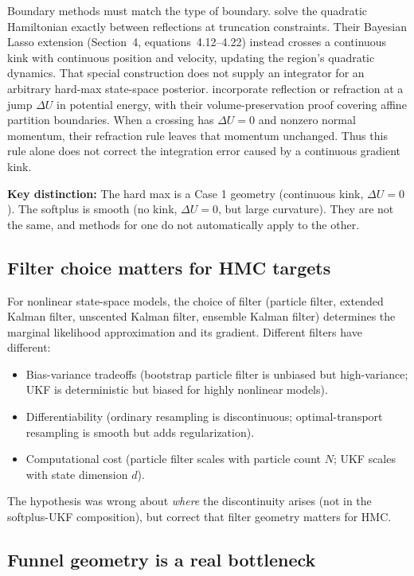 Boundary methods must match the type of boundary.
\citet[Section~2]{Pakman2014} solve the quadratic Hamiltonian exactly between
reflections at truncation constraints. Their Bayesian Lasso extension
(Section~4, equations~4.12--4.22) instead crosses a continuous kink with
continuous position and velocity, updating the region's quadratic dynamics.
That special construction does not supply an integrator for an arbitrary
hard-max state-space posterior. \citet[Algorithm~1 and Section~5]{Afshar2015}
incorporate reflection or refraction at a jump $\Delta U$ in potential energy,
with their volume-preservation proof covering affine partition boundaries.
When a crossing has $\Delta U=0$ and nonzero normal momentum, their refraction
rule leaves that momentum unchanged. Thus this rule alone does not correct
the integration error caused by a continuous gradient kink.

\textbf{Key distinction:} The hard max is a Case 1 geometry (continuous kink, $\Delta U = 0$). The softplus is smooth (no kink, $\Delta U = 0$, but large curvature). They are not the same, and methods for one do not automatically apply to the other.

\subsection{Filter choice matters for HMC targets}

For nonlinear state-space models, the choice of filter (particle filter, extended Kalman filter, unscented Kalman filter, ensemble Kalman filter) determines the marginal likelihood approximation and its gradient. Different filters have different:
\begin{itemize}
\item Bias-variance tradeoffs (bootstrap particle filter is unbiased but high-variance; UKF is deterministic but biased for highly nonlinear models).
\item Differentiability (ordinary resampling is discontinuous; optimal-transport resampling is smooth but adds regularization).
\item Computational cost (particle filter scales with particle count $N$; UKF scales with state dimension $d$).
\end{itemize}

The hypothesis was wrong about \emph{where} the discontinuity arises (not in the softplus-UKF composition), but correct that filter geometry matters for HMC.

\subsection{Funnel geometry is a real bottleneck}

